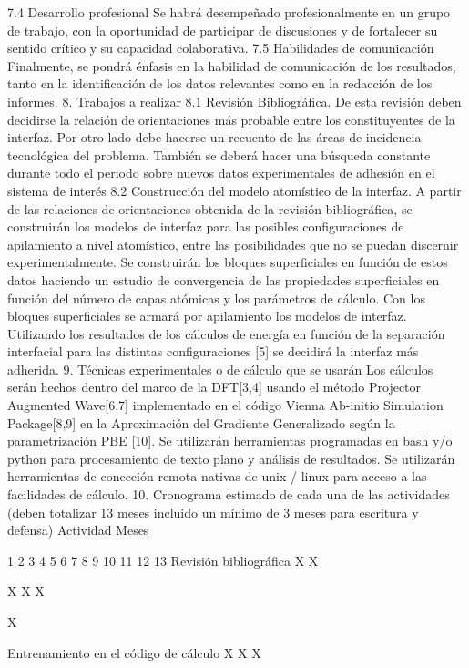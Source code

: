 7.4  Desarrollo profesional
Se habrá desempeñado profesionalmente en un grupo de trabajo, con la oportunidad de participar de discusiones y de fortalecer su sentido crítico y su capacidad colaborativa.
7.5  Habilidades de comunicación
Finalmente, se pondrá énfasis en la habilidad de comunicación de los resultados, tanto en la identificación de los datos relevantes como en la redacción de los informes. 
8. Trabajos a realizar
8.1  Revisión Bibliográfica. 
De esta revisión deben decidirse la relación de orientaciones más probable entre los constituyentes de la interfaz. Por otro lado debe hacerse un recuento de las áreas de incidencia tecnológica del problema. También se deberá hacer una búsqueda constante durante todo el periodo sobre nuevos datos experimentales de adhesión en el sistema de interés
8.2  Construcción del modelo atomístico de la interfaz.
A partir de las relaciones de orientaciones obtenida de la revisión bibliográfica, se construirán los modelos de interfaz para las posibles configuraciones de apilamiento a nivel atomístico, entre las posibilidades que no se puedan discernir experimentalmente. Se construirán los bloques superficiales en función de estos datos haciendo un estudio de convergencia de las propiedades superficiales en función del número de capas atómicas y los parámetros de cálculo. Con los bloques superficiales se armará por apilamiento los modelos de interfaz. Utilizando los resultados de los cálculos de energía en función de la separación interfacial para las distintas configuraciones [5] se decidirá la interfaz más adherida.
9. Técnicas experimentales o de cálculo que se usarán 
Los cálculos serán hechos dentro del marco de la DFT[3,4] usando el método Projector Augmented Wave[6,7] implementado en el código Vienna Ab-initio Simulation Package[8,9] en la Aproximación del Gradiente Generalizado según la parametrización PBE [10]. 
Se utilizarán herramientas programadas en bash y/o python para procesamiento de texto plano y análisis de resultados. Se utilizarán herramientas de conección remota nativas de unix / linux para acceso a las facilidades de cálculo.
10. Cronograma estimado de cada una de las actividades (deben totalizar 13 meses incluido un mínimo de 3 meses para escritura y defensa) 
Actividad
Meses

1
2
3
4
5
6
7
8
9
10
11
12
13
Revisión bibliográfica 
X
X




X
X
X

X


Entrenamiento en el código de cálculo
X
X
X










